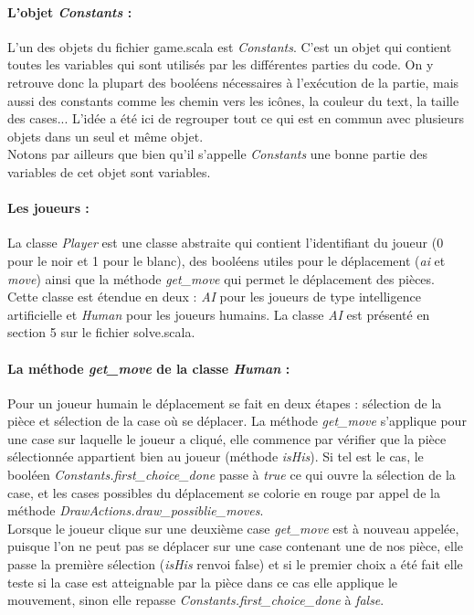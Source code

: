 \documentclass[a4paper]{article}
\begin{document}
\paragraph{L'objet \textit{Constants} :}L'un des objets du fichier game.scala est \textit{Constants}. C'est un objet qui contient toutes les variables qui sont utilisés par les différentes parties du code. On y retrouve donc la plupart des booléens nécessaires à l'exécution de la partie, mais aussi des constants comme les chemin vers les icônes, la couleur du text, la taille des cases... L'idée a été ici de regrouper tout ce qui est en commun avec plusieurs objets dans un seul et même objet. \\

Notons par ailleurs que bien qu'il s'appelle \textit{Constants} une bonne partie des variables de cet objet sont variables. 

\paragraph{Les joueurs :} La classe \textit{Player} est une classe abstraite qui contient l'identifiant du joueur (0 pour le noir et 1 pour le blanc), des booléens utiles pour le déplacement (\textit{ai} et \textit{move}) ainsi que la méthode \textit{get\_move} qui permet le déplacement des pièces. \\

Cette classe est étendue en deux : \textit{AI} pour les joueurs de type intelligence artificielle et \textit{Human} pour les joueurs humains. La classe \textit{AI} est présenté en section 5 sur le fichier solve.scala. 

\paragraph{La méthode \textit{get\_move} de la classe \textit{Human} :}Pour un joueur humain le déplacement se fait en deux étapes : sélection de la pièce et sélection de la case où se déplacer. La méthode \textit{get\_move} s'applique pour une case sur laquelle le joueur a cliqué, elle commence par vérifier que la pièce sélectionnée appartient bien au joueur (méthode \textit{isHis}). Si tel est le cas, le booléen \textit{Constants.first\_choice\_done} passe à \textit{true} ce qui ouvre la sélection de la case, et les cases possibles du déplacement se colorie en rouge par appel de la méthode \textit{DrawActions.draw\_possiblie\_moves}. \\

Lorsque le joueur clique sur une deuxième case \textit{get\_move} est à nouveau appelée, puisque l'on ne peut pas se déplacer sur une case contenant une de nos pièce, elle passe la première sélection (\textit{isHis} renvoi false) et si le premier choix a été fait elle teste si la case est atteignable par la pièce dans ce cas elle applique le mouvement, sinon elle repasse \textit{Constants.first\_choice\_done} à \textit{false}. 
\end{document}
